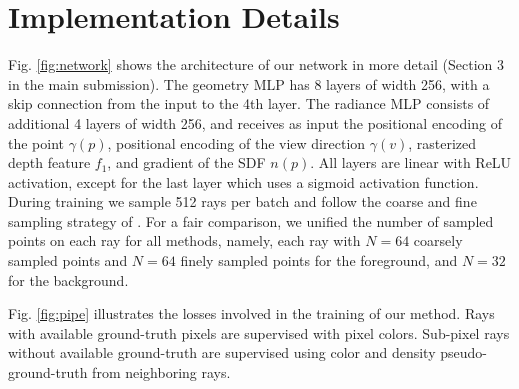 \section{Implementation Details}
Fig. \ref{fig:network} shows the architecture of our network in more detail (Section 3 in the main submission).
The geometry MLP has 8 layers of width 256,  with a skip connection from the input to the 4th layer. 
The radiance MLP consists of additional 4 layers of width 256, and receives as input the positional encoding of the point $\gamma(p)$, positional encoding of the view direction $\gamma(v)$, rasterized depth feature $f_1$, 
and gradient of the SDF $n(p)$. All layers are linear with ReLU activation, except for the last layer which uses a sigmoid activation function. 
 During training we sample  512  rays  per  batch  and  follow  the  coarse  and fine sampling strategy of \cite{mildenhall2020nerf,wang2021neus}. For a fair comparison, we unified the number of sampled points on each ray for all methods, namely, each ray with $N=64$ coarsely sampled points and $N=64$ finely sampled points for the 
 foreground,
 and $N=32$ for the 
 background.
%
%

Fig. \ref{fig:pipe} illustrates the losses involved in the training of our method. Rays with available ground-truth pixels are supervised with pixel colors. Sub-pixel rays without available ground-truth are supervised using color and density pseudo-ground-truth from neighboring rays.

